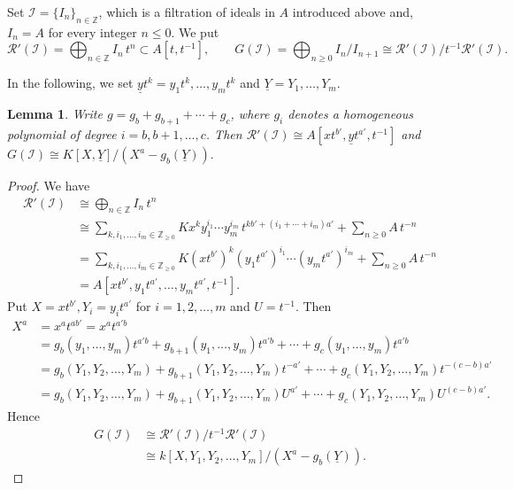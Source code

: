 \documentclass[12pt]{amsart}
\newtheorem{lem}[thm]{Lemma}
\theoremstyle{definition}
\theoremstyle{remark}
\numberwithin{equation}{section}
\newcommand{\bbZ}{\ensuremath{\mathbb Z}}
\begin{document}
\par \vspace{2mm}
Set $\mathcal{I}=\{I_{n}\}_{n \in \bbZ}$, which is a filtration of ideals in $A$ introduced above and, $I_{n}=A$ for every integer $n \le 0$. 
We put
\[
\mathcal{R}'(\mathcal{I})= \bigoplus_{n \in \bbZ} I_{n} \,t^{n}  \subset A[t,t^{-1}], \qquad 
G(\mathcal{I})  =\bigoplus_{n \ge 0} I_{n}/I_{n+1} 
\cong \mathcal{R}'(\mathcal{I})/t^{-1}\mathcal{R}'(\mathcal{I}). 
\]

In the following, we set $\underline{y}t^k = y_1t^k,\ldots,y_mt^k$ and 
$\underline{Y}=Y_1,\ldots,Y_m$. 

\begin{lem} \label{IN-filt}
Write $g=g_b+g_{b+1}+\cdots+g_c$, where $g_i$ denotes a homogeneous polynomial of degree $i=b,b+1,\ldots,c$. 
Then 
$\mathcal{R}'(\mathcal{I}) \cong A[xt^{b'}, \underline{y}t^{a'}, t^{-1}]$  and $ G(\mathcal{I})  \cong K[X, \underline{Y}]/(X^a-g_b(\underline{Y})).$
\end{lem} 

\begin{proof}
We have 
\begin{equation*}
 \begin{split}
  \mathcal{R}'(\mathcal{I}) 
  & \cong \bigoplus_{n \in \bbZ} I_{n} \,t^{n} \\
  & \cong \sum_{k, i_1, \ldots, i_m \in \mathbb{Z}_{\geq 0}} Kx^k 
  y_1^{i_1}\cdots y_m^{i_m} \, t^{kb' +(i_1+\cdots+i_m)a'} +\sum_{n \geq 0}A \,t^{-n} \\
  & = \sum_{k, i_1, \ldots, i_m \in \mathbb{Z}_{\geq 0}}  K(xt^{b'})^k (y_1t^{a'})^{i_1} \cdots (y_mt^{a'})^{i_m} +\sum_{n \geq 0}A \, t^{-n} \\
  & = A[xt^{b'}, y_1t^{a'}, \ldots, y_mt^{a'}, t^{-1}].
  \end{split}
\end{equation*}
Put $X = xt^{b'}, Y_i = y_it^{a'}$ for $i = 1, 2, \ldots, m$  and $U = t^{-1}$. Then
\begin{equation*}
 \begin{split}
  X^a & = x^at^{ab'} = x^a t^{a'b} \\
        & = g_b(y_1, \ldots, y_m)t^{a'b} +g_{b+1}(y_1, \ldots, y_m)t^{a'b}+ \cdots + g_c(y_1, \ldots, y_m)t^{a'b} \\
        & = g_b(Y_1, Y_2, \ldots, Y_m) +g_{b+1}(Y_1, Y_2, \ldots, Y_m)t^{-a'} + \cdots + g_c(Y_1, Y_2, \ldots, Y_m)t^{-(c-b)a'} \\
        & = g_b(Y_1, Y_2, \ldots, Y_m) +g_{b+1}(Y_1, Y_2, \ldots, Y_m)U^{a'} + \cdots + g_c(Y_1, Y_2, \ldots, Y_m)U^{(c-b)a'}.
    \end{split}
\end{equation*}
Hence 
\begin{equation*}
    \begin{split}
        G(\mathcal{I}) & \cong \mathcal{R}'(\mathcal{I})/t^{-1}\mathcal{R}'(\mathcal{I}) \\
        & \cong  k[X, Y_1, Y_2, \ldots, Y_m]/(X^a-g_b(\underline{Y})).
    \end{split}
\end{equation*}
\end{proof}
\end{document}
